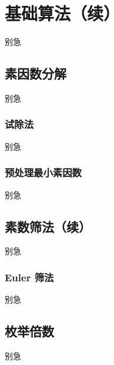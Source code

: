 
\section{基础算法（续）}
\begin{frame}{别急}\end{frame} %
\subsection{素因数分解}
\begin{frame}[c]
  \progressnow*
\end{frame}
\begin{frame}{别急}\end{frame} %
\subsubsection{试除法}
\begin{frame}[c]
  \progressnow
\end{frame}
\begin{frame}{别急}\end{frame} %
\subsubsection{预处理最小素因数}
\begin{frame}[c]
  \progressnow
\end{frame}
\begin{frame}{别急}\end{frame} %
\subsection{素数筛法（续）}
\begin{frame}[c]
  \progressnow*
\end{frame}
\begin{frame}{别急}\end{frame} %
\subsubsection{Euler 筛法}
\begin{frame}[c]
  \progressnow
\end{frame}
\begin{frame}{别急}\end{frame} %
\subsection{枚举倍数}
\begin{frame}[c]
  \progressnow*
\end{frame}
\begin{frame}{别急}\end{frame} %
